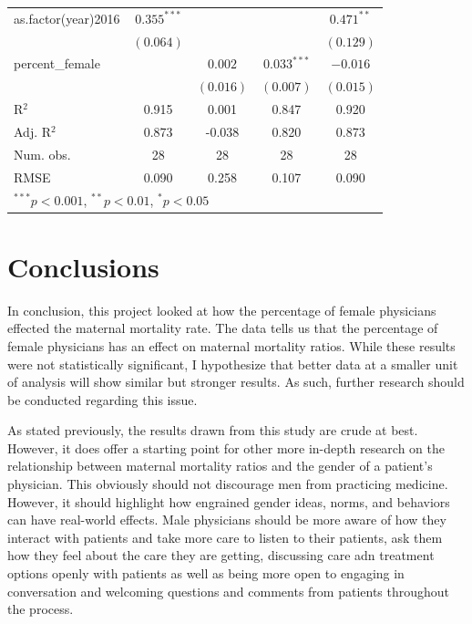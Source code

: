 \documentclass[11pt,]{article}
\begin{document}
\begin{table}
\begin{center}
\begin{tabular}{l c c c c }
as.factor(year)2016 & $0.355^{***}$  &                &                & $0.471^{**}$   \\
                    & $(0.064)$      &                &                & $(0.129)$      \\
percent\_female     &                & $0.002$        & $0.033^{***}$  & $-0.016$       \\
                    &                & $(0.016)$      & $(0.007)$      & $(0.015)$      \\
\hline
R$^2$               & 0.915          & 0.001          & 0.847          & 0.920          \\
Adj. R$^2$          & 0.873          & -0.038         & 0.820          & 0.873          \\
Num. obs.           & 28             & 28             & 28             & 28             \\
RMSE                & 0.090          & 0.258          & 0.107          & 0.090          \\
\hline
\multicolumn{5}{l}{\scriptsize{$^{***}p<0.001$, $^{**}p<0.01$, $^*p<0.05$}}
\end{tabular}
\label{table:coefficients}
\end{center}
\end{table}

\section{Conclusions}\label{conclusions}

In conclusion, this project looked at how the percentage of female
physicians effected the maternal mortality rate. The data tells us that
the percentage of female physicians has an effect on maternal mortality
ratios. While these results were not statistically significant, I
hypothesize that better data at a smaller unit of analysis will show
similar but stronger results. As such, further research should be
conducted regarding this issue.

As stated previously, the results drawn from this study are crude at
best. However, it does offer a starting point for other more in-depth
research on the relationship between maternal mortality ratios and the
gender of a patient's physician. This obviously should not discourage
men from practicing medicine. However, it should highlight how engrained
gender ideas, norms, and behaviors can have real-world effects. Male
physicians should be more aware of how they interact with patients and
take more care to listen to their patients, ask them how they feel about
the care they are getting, discussing care adn treatment options openly
with patients as well as being more open to engaging in conversation and
welcoming questions and comments from patients throughout the process.
\end{document}
